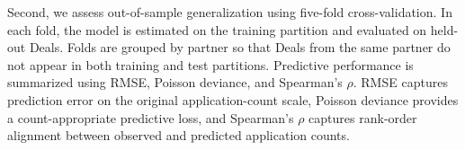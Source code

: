 Second, we assess out-of-sample generalization using five-fold cross-validation. In each fold, the model is estimated on the training partition and evaluated on held-out Deals. Folds are grouped by partner so that Deals from the same partner do not appear in both training and test partitions. Predictive performance is summarized using RMSE, Poisson deviance, and Spearman's $\rho$. RMSE captures prediction error on the original application-count scale, Poisson deviance provides a count-appropriate predictive loss, and Spearman's $\rho$ captures rank-order alignment between observed and predicted application counts.









